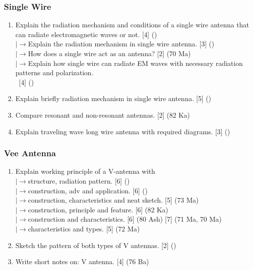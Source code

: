 \documentclass[12pt]{article}
\newcommand{\lb}{\\$\left|\rightarrow\right.$}
\newcommand{\enter}{\\\textcolor{white}{1}}
\begin{document}
    \subsubsection{Single Wire}
      \begin{enumerate}
        \item Explain the radiation mechanism and conditions of a single wire antenna that can radiate electromagnetic waves or not. \hfill [4] ()
          \lb Explain the radiation mechanism in single wire antenna. \hfill [3] ()
          \lb How does a single wire act as an antenna? \hfill [2] (70 Ma)
          \lb Explain how single wire can radiate EM waves with necessary radiation patterns and polarization.
            \enter\hfill [4] ()
        
        \item Explain briefly radiation mechanism in single wire antenna. \hfill [5] ()

        \item Compare resonant and non-resonant antennas. \hfill [2] (82 Ka)

        \item Explain traveling wave long wire antenna with required diagrams. \hfill [3] ()
      \end{enumerate}

    \subsubsection{Vee Antenna}
      \begin{enumerate}
        \item Explain working principle of a V-antenna with
          \lb structure, radiation pattern. \hfill [6] ()
          \lb construction, adv and application. \hfill [6] ()
          \lb construction, characteristics and neat sketch. \hfill [5] (73 Ma)
          \lb construction, principle and feature. \hfill [6] (82 Ka)
          \lb construction and characteristics. \hfill [6] (80 Ash) [7] (71 Ma, 70 Ma)
          \lb characteristics and types. \hfill [5] (72 Ma)

        \item Sketch the pattern of both types of V antennas. \hfill [2] ()

        \item Write short notes on: V antenna. \hfill [4] (76 Ba)
      \end{enumerate}
\end{document}

